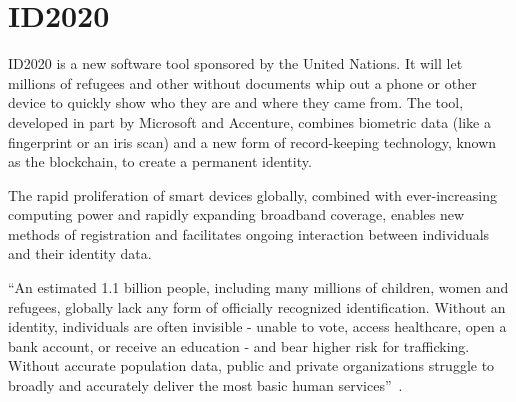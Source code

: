 \section{ID2020}

ID2020 is a new software tool sponsored by the United Nations. It will let millions of refugees and other without documents whip out a phone or other device to quickly show who they are and where they came from. The tool, developed in part by Microsoft and Accenture, combines biometric data (like a fingerprint or an iris scan) and a new form of record-keeping technology, known as the blockchain, to create a permanent identity.
 
The rapid proliferation of smart devices globally, combined with ever-increasing computing power and rapidly expanding broadband coverage, enables new methods of registration and facilitates ongoing interaction between individuals and their identity data. 
 
 ``An estimated 1.1 billion people, including many millions of children, women and refugees, globally lack any form of officially recognized identification. Without an identity, individuals are often invisible - unable to vote, access healthcare, open a bank account, or receive an education - and bear higher risk for trafficking. Without accurate population data, public and private organizations struggle to broadly and accurately deliver the most basic human services''~\cite{hid-sp18-506-NoID}.
